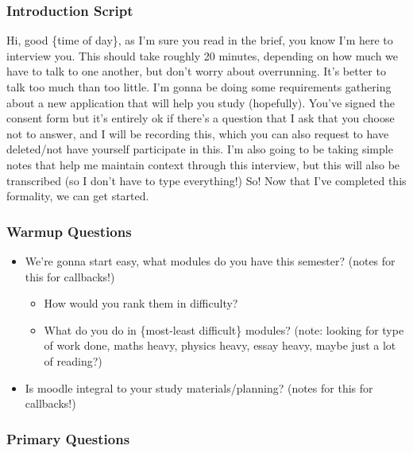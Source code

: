 \documentclass[a4paper,11pt]{article}
\begin{document}
\subsubsection*{Introduction Script}
Hi, good \{time of day\}, as I'm sure you read in the brief, you know I'm here to interview you. This should take roughly 20 minutes, depending 
on how much we have to talk to one another, but don't worry about overrunning. It's better to talk too much than too little. I'm gonna be doing some requirements gathering
about a new application that will help you study (hopefully). You've signed the consent form but it's entirely ok if there's a question that I ask that you 
choose not to answer, and I will be recording this, which you can also request to have deleted/not have yourself participate in this. I'm also going to be taking
simple notes that help me maintain context through this interview, but this will also be transcribed (so I don't have to type everything!) So! Now that I've completed 
this formality, we can get started. 
\subsubsection*{Warmup Questions}
\begin{itemize}
    \item We're gonna start easy, what modules do you have this semester? (notes for this for callbacks!)
    \begin{itemize}
        \item How would you rank them in difficulty?
        \item What do you do in \{most-least difficult\} modules? (note: looking for type of work done, maths heavy, physics heavy, essay heavy, maybe just a lot of reading?)
    \end{itemize}
    \item Is moodle integral to your study materials/planning? (notes for this for callbacks!)
\end{itemize}

\subsubsection*{Primary Questions}
\end{document}
